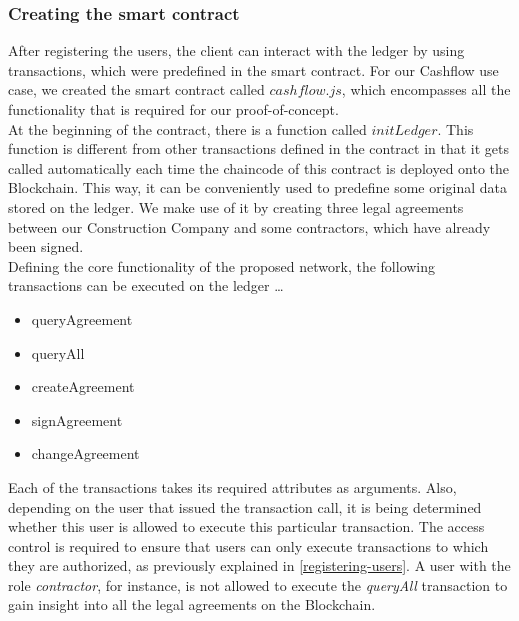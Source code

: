 \subsubsection {Creating the smart contract} \label{smart-contract}
After registering the users, the client can interact with the ledger by using transactions, which were predefined in the smart contract. For our Cashflow use case, we created the smart contract called $ cashflow.js $, which encompasses all the functionality that is required for our proof-of-concept. \\
At the beginning of the contract, there is a function called $ initLedger $. This function is different from other transactions defined in the contract in that it gets called automatically each time the chaincode of this contract is deployed onto the Blockchain. This way, it can be conveniently used to predefine some original data stored on the ledger. 
We make use of it by creating three legal agreements between our Construction Company and some contractors, which have already been signed. \\
Defining the core functionality of the proposed network, the following transactions can be executed on the ledger \ldots
\begin{itemize}
	\item queryAgreement
	\item queryAll
	\item createAgreement
	\item signAgreement
	\item changeAgreement
\end{itemize}
Each of the transactions takes its required attributes as arguments. Also, depending on the user that issued the transaction call, it is being determined whether this user is allowed to execute this particular transaction. The access control is required to ensure that users can only execute transactions to which they are authorized, as previously explained in \ref{registering-users}. A user with the role \textit{contractor}, for instance, is not allowed to execute the \textit{queryAll} transaction to gain insight into all the legal agreements on the Blockchain. %

